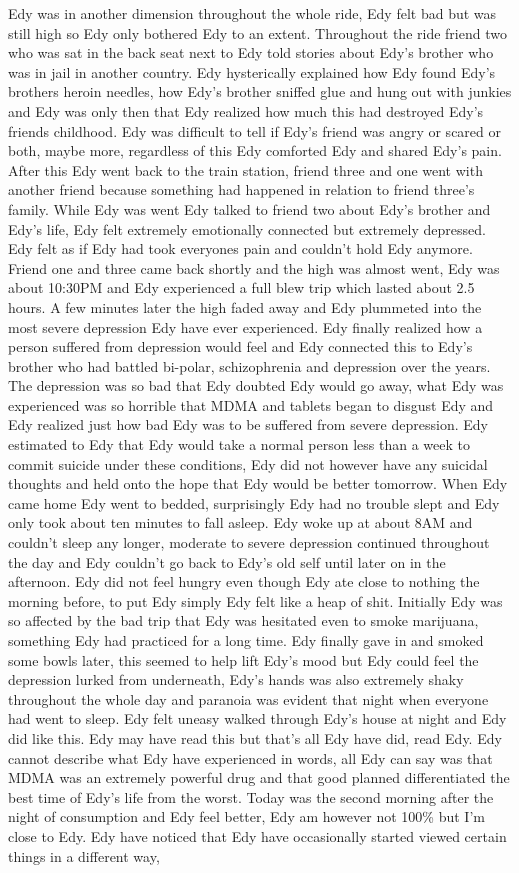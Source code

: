 \documentclass[12pt]{book}
\begin{document}
Edy was in another dimension throughout the whole ride, Edy felt bad but was still high so Edy only bothered Edy to an extent. Throughout the ride friend two who was sat in the back seat next to Edy told stories about Edy's brother who was in jail in another country. Edy hysterically explained how Edy found Edy's brothers heroin needles, how Edy's brother sniffed glue and hung out with junkies and Edy was only then that Edy realized how much this had destroyed Edy's friends childhood. Edy was difficult to tell if Edy's friend was angry or scared or both, maybe more, regardless of this Edy comforted Edy and shared Edy's pain. After this Edy went back to the train station, friend three and one went with another friend because something had happened in relation to friend three's family. While Edy was went Edy talked to friend two about Edy's brother and Edy's life, Edy felt extremely emotionally connected but extremely depressed. Edy felt as if Edy had took everyones pain and couldn't hold Edy anymore. Friend one and three came back shortly and the high was almost went, Edy was about 10:30PM and Edy experienced a full blew trip which lasted about 2.5 hours. A few minutes later the high faded away and Edy plummeted into the most severe depression Edy have ever experienced. Edy finally realized how a person suffered from depression would feel and Edy connected this to Edy's brother who had battled bi-polar, schizophrenia and depression over the years. The depression was so bad that Edy doubted Edy would go away, what Edy was experienced was so horrible that MDMA and tablets began to disgust Edy and Edy realized just how bad Edy was to be suffered from severe depression. Edy estimated to Edy that Edy would take a normal person less than a week to commit suicide under these conditions, Edy did not however have any suicidal thoughts and held onto the hope that Edy would be better tomorrow. When Edy came home Edy went to bedded, surprisingly Edy had no trouble slept and Edy only took about ten minutes to fall asleep. Edy woke up at about 8AM and couldn't sleep any longer, moderate to severe depression continued throughout the day and Edy couldn't go back to Edy's old self until later on in the afternoon. Edy did not feel hungry even though Edy ate close to nothing the morning before, to put Edy simply Edy felt like a heap of shit. Initially Edy was so affected by the bad trip that Edy was hesitated even to smoke marijuana, something Edy had practiced for a long time. Edy finally gave in and smoked some bowls later, this seemed to help lift Edy's mood but Edy could feel the depression lurked from underneath, Edy's hands was also extremely shaky throughout the whole day and paranoia was evident that night when everyone had went to sleep. Edy felt uneasy walked through Edy's house at night and Edy did like this. Edy may have read this but that's all Edy have did, read Edy. Edy cannot describe what Edy have experienced in words, all Edy can say was that MDMA was an extremely powerful drug and that good planned differentiated the best time of Edy's life from the worst. Today was the second morning after the night of consumption and Edy feel better, Edy am however not 100\% but I'm close to Edy. Edy have noticed that Edy have occasionally started viewed certain things in a different way, 
\end{document}
